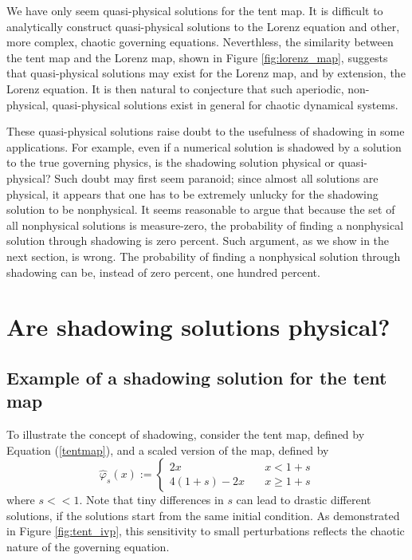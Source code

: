 We have only seem quasi-physical solutions for the tent map.
It is difficult to analytically construct quasi-physical solutions
to the Lorenz equation and other, more complex, chaotic governing
equations.  Neverthless, the similarity between the tent map and the
Lorenz map, shown in Figure \ref{fig:lorenz_map}, suggests that
quasi-physical solutions may exist for the Lorenz map, and by
extension, the Lorenz equation.  It is then natural to conjecture
that such aperiodic, non-physical, quasi-physical solutions
exist in general for chaotic dynamical systems.

These quasi-physical solutions raise doubt to the usefulness of shadowing
in some applications.  For example, even if a numerical
solution is shadowed by a solution to the true governing physics,
is the shadowing solution physical or quasi-physical?  Such doubt may first
seem paranoid; since almost all solutions are physical, it appears
that one has to be extremely unlucky for the shadowing solution to
be nonphysical. It seems reasonable to argue that because the set of
all nonphysical solutions is measure-zero, the probability of finding
a nonphysical solution through shadowing is zero percent.  Such argument,
as we show in the next section, is wrong.  The probability of
finding a nonphysical solution through shadowing can be, instead of
zero percent, one hundred percent.

\section{Are shadowing solutions physical?}

\subsection{Example of a shadowing solution for the tent map}
To illustrate the concept of shadowing, consider the tent map, defined
by Equation (\ref{tentmap}), and a scaled version of the map, defined by
\begin{equation} \label{tent_scaled}
    \hat\varphi_s(x) := \begin{cases}
    2x \quad & x < 1+s \\
    4(1+s) - 2x \quad & x \ge 1+s
    \end{cases}
\end{equation}
where $s<<1$.  Note that tiny differences in $s$ can lead to drastic
different solutions, if the solutions start from the same initial condition.
As demonstrated in Figure \ref{fig:tent_ivp}, this sensitivity to small
perturbations reflects the chaotic nature of the governing equation.

